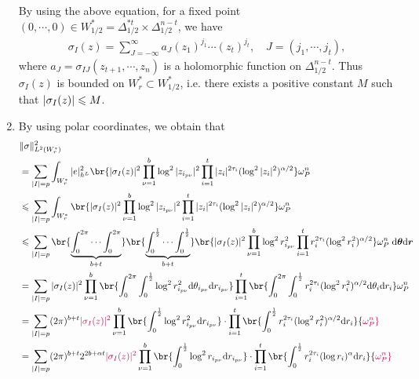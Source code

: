 \documentclass[lang=en,12pt]{beautybook}
\begin{document}
\begin{solution}
\begin{enumerate}
        By using the above equation, for a fixed point $(0,\cdots,0)\in W_{1/2}^*=\Delta_{1/2}^{*t}\times \Delta_{1/2}^{n-t}$, we have 
        \begin{align*}
            \sigma_I(z)=\sum_{J=-\infty}^{\infty} a_J (z_1)^{j_1} \cdots (z_t)^{j_t}, \quad J=(j_1,\cdots,j_t),
        \end{align*}
            where $a_J=\sigma_{IJ}(z_{t+1},\cdots,z_n)$ is a holomorphic function on $\Delta_{1/2}^{n-t}$. Thus $\sigma_I(z)$ is bounded on $W_r^*\subset W_{1/2}^*$, i.e. there exists a positive constant $M$ such that $\abs{\sigma_I(z)}\leqslant M$.
        \item By using polar coordinates, we obtain that
        {\small
        \begin{align*}
            &\|\sigma\|^2_{L^2(W_r^*)} \\
            &=\sum_{|I|=p}\int_{W_r^*} |e|^2_{h^L} \br{ |\sigma_I(z)|^2 \prod_{\nu=1}^b \log^2 |z_{i_{p\nu}}|^2 \prod_{i=1}^t |z_i|^{2\tau_i}(\log^2 |z_i|^2)^{\alpha/2} } \omega_P^n \\
            &\leqslant \sum_{|I|=p}\int_{W_r^*}  \br{ |\sigma_I(z)|^2 \prod_{\nu=1}^b \log^2 |z_{i_{p\nu}}|^2 \prod_{i=1}^t |z_i|^{2\tau_i}(\log^2 |z_i|^2)^{\alpha/2} } \omega_P^n \\
            &\leqslant\sum_{|I|=p} \br{\underbrace{\int_0^{2\pi}\cdots \int_0^{2\pi}}_{b+t}}\br{\underbrace{\int_{0}^{\frac 12}\cdots \int_{0}^{\frac 12}}_{b+t}}  \br{ |\sigma_I(z)|^2 \prod_{\nu=1}^b \log^2 r_{i_{p\nu}}^2 \prod_{i=1}^t r_i^{2\tau_i}(\log^2 r_i^2)^{\alpha/2} } \omega_P^n \;\dd \bm{\theta}\dd \bm{r} \\ 
            &=\sum_{|I|=p}|\sigma_I(z)|^2 \prod_{\nu=1}^b\br{ \int_0^{2\pi}\int_{0}^{\frac 12} \log^2 r_{i_{p\nu}}^2 \dd \theta_{i_{p\nu}}\dd r_{i_{p\nu}} } \prod_{i=1}^t\br{ \int_0^{2\pi}\int_{0}^{\frac 12} r_i^{2\tau_i}(\log^2 r_i^2)^{\alpha/2} \dd \theta_i\dd r_{i} } \omega_P^n \\
            &=\sum_{|I|=p}(2\pi)^{b+t}{\color{purple}|\sigma_I(z)|^2} \prod_{\nu=1}^b\br{ \int_{0}^{\frac 12} \log^2 r_{i_{p\nu}}^2 \dd r_{i_{p\nu}} }\cdot \prod_{i=1}^t\br{ \int_{0}^{\frac 12} r_i^{2\tau_i}(\log^2 r_i^2)^{\alpha/2} \dd r_i } {\color{purple}\omega_P^n}\\ 
            &=\sum_{|I|=p}(2\pi)^{b+t} 2^{2b+\alpha t}{\color{purple}|\sigma_I(z)|^2} \prod_{\nu=1}^b\br{ \int_{0}^{\frac 12} \log^2 r_{i_{p\nu}} \dd r_{i_{p\nu}} }\cdot \prod_{i=1}^t\br{ \int_{0}^{\frac 12} r_i^{2\tau_i}(\log r_i)^{\alpha} \dd r_i } {\color{purple}\omega_P^n}\\ 

\end{align*}}
\end{enumerate}
\end{solution}
\end{document}
